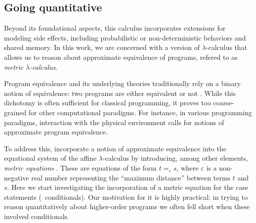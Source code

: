 





\subsection*{Going quantitative}

Beyond its foundational aspects, this calculus incorporates extensions for modeling side effects, including probabilistic or non-deterministic behaviors and shared memory. In this work, we are concerned with a version of $\lambda$-calculus that allows us to reason about approximate equivalence of programs, refered to as \emph{metric }$\lambda$\emph{-calculus}.

Program equivalence and its underlying theories traditionally rely on a binary notion of equivalence: two programs are either equivalent or not \cite{winskel93}. While this dichotomy is often sufficient for classical programming, it proves too coarse-grained for other computational paradigms. For instance, in various programming paradigms, interaction with the physical environment calls for notions of approximate program equivalence. 

To address this, \cite{dahlqvistInternalLanguage2022,dahlqvist2023syntactic} incorporate a notion of approximate equivalence into the equational system of the affine $\lambda$-calculus by introducing, among other elements, \emph{metric equations} \cite{mardare2016quantitative, mardare2017axiomatizability}. These are equations of the form $t =_{\varepsilon} s$, where $\varepsilon$ is a non-negative real number representing the ``maximum distance'' between terms $t$ and $s$. Here we start investigating the incorporation of a metric equation for the case statements (\ie\ conditionals). Our motivation for it is highly practical: in trying to reason quantitatively about higher-order programs we often fell short when these involved conditionals.


